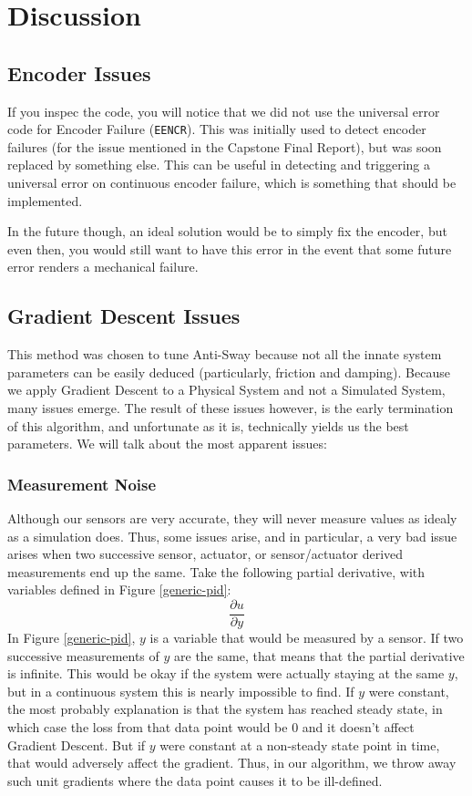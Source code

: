 \documentclass[letterpaper]{article}
\begin{document}
\newpage

\section{Discussion}
\subsection{Encoder Issues}
If you inspec the code, you will notice that we did not use the universal error code for Encoder Failure (\texttt{EENCR}). This was initially used to detect encoder failures (for the issue mentioned in the Capstone Final Report), but was soon replaced by something else. This can be useful in detecting and triggering a universal error on continuous encoder failure, which is something that should be implemented.

In the future though, an ideal solution would be to simply fix the encoder, but even then, you would still want to have this error in the event that some future error renders a mechanical failure.
\subsection{Gradient Descent Issues}
This method was chosen to tune Anti-Sway because not all the innate system parameters can be easily deduced (particularly, friction and damping). Because we apply Gradient Descent to a Physical System and not a Simulated System, many issues emerge. The result of these issues however, is the early termination of this algorithm, and unfortunate as it is, technically yields us the best parameters. We will talk about the most apparent issues:
\subsubsection{Measurement Noise}
Although our sensors are very accurate, they will never measure values as idealy as a simulation does. Thus, some issues arise, and in particular, a very bad issue arises when two successive sensor, actuator, or sensor/actuator derived measurements end up the same. Take the following partial derivative, with variables defined in Figure \ref{generic-pid}:
$$\frac{\partial u}{\partial y}$$
In Figure \ref{generic-pid}, $y$ is a variable that would be measured by a sensor. If two successive measurements of $y$ are the same, that means that the partial derivative is infinite. This would be okay if the system were actually staying at the same $y$, but in a continuous system this is nearly impossible to find. If $y$ were constant, the most probably explanation is that the system has reached steady state, in which case the loss from that data point would be 0 and it doesn't affect Gradient Descent. But if $y$ were constant at a non-steady state point in time, that would adversely affect the gradient. Thus, in our algorithm, we throw away such unit gradients where the data point causes it to be ill-defined.
\end{document}
